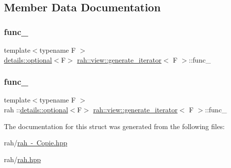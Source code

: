 \subsection{Member Data Documentation}
\mbox{\label{structrah_1_1view_1_1generate__iterator_a05bac9e07fa0f0f285f79dec0337ca68}} 
\subsubsection{\texorpdfstring{func\_}{func\_}\hspace{0.1cm}{\footnotesize\ttfamily [1/2]}}
{\footnotesize\ttfamily template$<$typename F $>$ \\
\mbox{\hyperlink{structrah_1_1view_1_1details_1_1optional}{details\+::optional}}$<$F$>$ \mbox{\hyperlink{structrah_1_1view_1_1generate__iterator}{rah\+::view\+::generate\+\_\+iterator}}$<$ F $>$\+::func\+\_\+\hspace{0.3cm}{\ttfamily [mutable]}}

\mbox{\label{structrah_1_1view_1_1generate__iterator_a1ed574d1a5a840a51e7d76b9d741a7aa}} 
\subsubsection{\texorpdfstring{func\_}{func\_}\hspace{0.1cm}{\footnotesize\ttfamily [2/2]}}
{\footnotesize\ttfamily template$<$typename F $>$ \\
rah \+::\mbox{\hyperlink{structrah_1_1view_1_1details_1_1optional}{details\+::optional}}$<$F$>$ \mbox{\hyperlink{structrah_1_1view_1_1generate__iterator}{rah\+::view\+::generate\+\_\+iterator}}$<$ F $>$\+::func\+\_\+\hspace{0.3cm}{\ttfamily [mutable]}}



The documentation for this struct was generated from the following files\+:\begin{DoxyCompactItemize}
\item 
rah/\mbox{\hyperlink{rah_01-_01_copie_8hpp}{rah -\/ Copie.\+hpp}}\item 
rah/\mbox{\hyperlink{rah_8hpp}{rah.\+hpp}}\end{DoxyCompactItemize}
